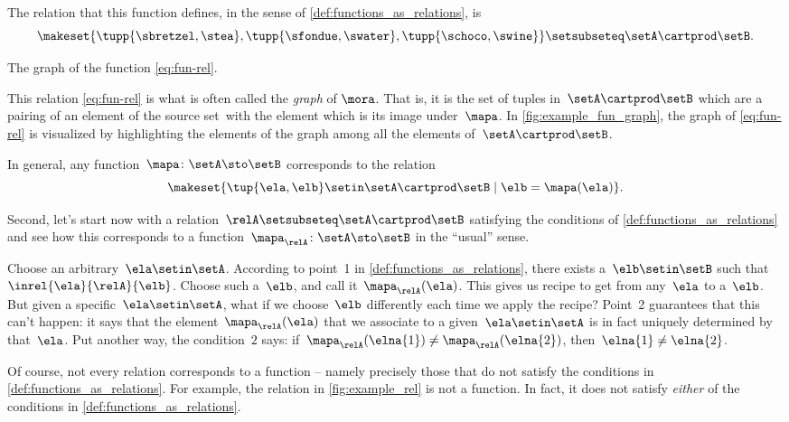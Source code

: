 The relation that this function defines, in the sense of \cref{def:functions_as_relations}, is
%
\begin{equation}
    \label{eq:fun-rel}
    \makeset{ \tupp{\sbretzel, \stea}, \tupp{\sfondue, \swater}, \tupp{\schoco, \swine} } \setsubseteq \setA \cartprod \setB.
\end{equation}
\begin{marginfigure}
    \centering
    \caption{The graph of the function \cref{eq:fun-rel}.}
    \label{fig:example_fun_graph}
\end{marginfigure}

This relation \cref{eq:fun-rel} is what is often called the \emph{graph} of $\mora$.
That is, it is the set of tuples in~$\setA \cartprod \setB$ which are a pairing of an element of the source set~\setA with the element which is its image under~$\mapa$.
In \cref{fig:example_fun_graph}, the graph of \cref{eq:fun-rel} is visualized by highlighting the elements of the graph among all the elements of~$\setA \cartprod \setB$.

In general, any function~$\mapa \colon \setA \sto \setB$ corresponds to the relation
\begin{equation}
    \makeset{ \tup{\ela,\elb} \setin \setA \cartprod \setB \mid \elb= \mapa(\ela) }.
\end{equation}

Second, let's start now with a relation~$\relA \setsubseteq \setA \cartprod \setB$ satisfying the conditions of \cref{def:functions_as_relations} and see how this corresponds to a function~$\mapa_\relA \colon \setA \sto \setB$ in the ``usual'' sense.

Choose an arbitrary~$\ela \setin \setA$.
According to point~1 in \cref{def:functions_as_relations}, there exists a~$\elb \setin \setB$ such that~$\inrel{\ela}{\relA}{\elb}$.
Choose such a~$\elb$, and call it~$\mapa_\relA(\ela)$.
This gives us recipe to get from any~$\ela$ to a~$\elb$.
But given a specific~$\ela \setin \setA$, what if we choose~$\elb$ differently each time we apply the recipe?
Point~2 guarantees that this can't happen: it says that the element~$\mapa_\relA(\ela)$ that we associate to a given~$\ela \setin \setA$ is in fact uniquely determined by that~$\ela$.
Put another way, the condition~$2$ says: if~$\mapa_\relA(\elna{1}) \neq \mapa_\relA(\elna{2})$, then~$\elna{1} \neq\elna{2}$.

\begin{remark}
    Of course, not every relation corresponds to a function -- namely precisely those that do not satisfy the conditions in \cref{def:functions_as_relations}.
    For example, the relation in \cref{fig:example_rel} is not a function.
    In fact, it does not satisfy \emph{either} of the conditions in \cref{def:functions_as_relations}.
\end{remark}

